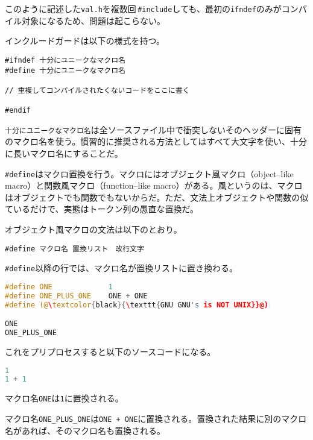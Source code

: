 このように記述した\texttt{val.h}を複数回\,\texttt{\#include}しても、最初の\texttt{ifndef}のみがコンパイル対象になるため、問題は起こらない。

インクルードガードは以下の様式を持つ。

\begin{lstlisting}[style=grammar]
#ifndef 十分にユニークなマクロ名
#define 十分にユニークなマクロ名 

// 重複してコンパイルされたくないコードをここに書く

#endif
\end{lstlisting}

\texttt{十分にユニークなマクロ名}は全ソースファイル中で衝突しないそのヘッダーに固有のマクロ名を使う。慣習的に推奨される方法としてはすべて大文字を使い、十分に長いマクロ名にすることだ。


\texttt{\#define}はマクロ置換を行う。マクロにはオブジェクト風マクロ（object--like macro）と関数風マクロ（function--like macro）がある。風というのは、マクロはオブジェクトでも関数でもないからだ。ただ、文法上オブジェクトや関数の似ているだけで、実態はトークン列の愚直な置換だ。


オブジェクト風マクロの文法は以下のとおり。

\begin{lstlisting}[style=grammar]
#define マクロ名 置換リスト　改行文字
\end{lstlisting}

\texttt{\#define}以降の行では、マクロ名が置換リストに置き換わる。

\begin{lstlisting}[language={C++}]
#define ONE             1
#define ONE_PLUS_ONE    ONE + ONE
#define (@\textcolor{black}{\texttt{GNU GNU's is NOT UNIX}}@)

ONE
ONE_PLUS_ONE
\end{lstlisting}

これをプリプロセスすると以下のソースコードになる。

\begin{lstlisting}[language={C++}]
1
1 + 1
\end{lstlisting}

マクロ名\texttt{ONE}は\texttt{1}に置換される。

マクロ名\texttt{ONE\_PLUS\_ONE}は\texttt{ONE + ONE}に置換される。置換された結果に別のマクロ名があれば、そのマクロ名も置換される。

